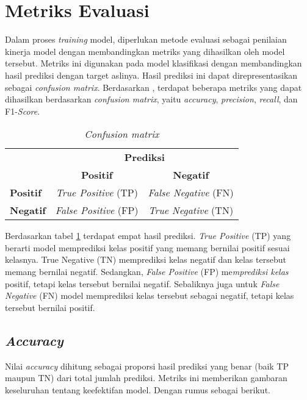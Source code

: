 \section{Metriks Evaluasi}

Dalam proses \textit{training} model, diperlukan metode evaluasi sebagai penilaian kinerja model dengan membandingkan metriks yang dihasilkan oleh model tersebut. Metriks ini digunakan pada model klasifikasi dengan membandingkan hasil prediksi dengan target aslinya. Hasil prediksi ini dapat direpresentasikan sebagai \textit{confusion matrix}. Berdasarkan \citeauthor{metrics}, terdapat beberapa metriks yang dapat dihasilkan berdasarkan \textit{confusion matrix}, yaitu \textit{accuracy}, \textit{precision}, \textit{recall}, dan F1-\textit{Score}.

\begin{table}[ht]
    \centering
        \caption{\textit{Confusion matrix}}
        \label{table:confusion-matrix}
        \begin{tabular}{|l|c|c|}
        \hline
        \rowcolor{black!10}
        \multicolumn{1}{|c|}{\textbf{Target}} & \multicolumn{2}{c|}{\textbf{Prediksi}} \\ \cline{2-3} 
        \rowcolor{black!10}
        & \textbf{Positif} & \textbf{Negatif} \\ \hline
        \textbf{Positif} & \textit{True Positive} (TP) & \textit{False Negative} (FN) \\ \hline
        \textbf{Negatif} & \textit{False Positive} (FP) & \textit{True Negative} (TN) \\ \hline
    \end{tabular}
\end{table}

Berdasarkan tabel \ref{table:confusion-matrix} terdapat empat hasil prediksi. \textit{True Positive} (TP) yang berarti model memprediksi kelas positif yang memang bernilai positif sesuai kelasnya. True Negative (TN) memprediksi kelas negatif dan kelas tersebut memang bernilai negatif. Sedangkan, \textit{False Positive} (FP) me\textit{mprediksi kelas} positif, tetapi kelas tersebut bernilai negatif. Sebaliknya juga untuk \textit{False Negative} (FN) model memprediksi kelas tersebut sebagai negatif, tetapi kelas tersebut bernilai positif.

\subsection{\textit{Accuracy}}
Nilai \textit{accuracy} dihitung sebagai proporsi hasil prediksi yang benar (baik TP maupun TN) dari total jumlah prediksi. Metriks ini memberikan gambaran keseluruhan tentang keefektifan model. Dengan rumus sebagai berikut.

